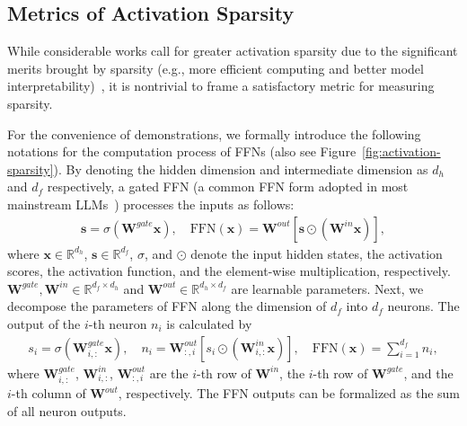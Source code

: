 \documentclass{article} %
\begin{document}

\subsection{Metrics of Activation Sparsity} \label{sec:related-metric}

While considerable works call for greater activation sparsity due to the significant merits brought by sparsity (e.g., more efficient computing and better model interpretability)~\citep{mirzadeh2023relu,song2024prosparse,song2024turbo}, it is nontrivial to frame a satisfactory metric for measuring sparsity.

For the convenience of demonstrations, we formally introduce the following notations for the computation process of FFNs (also see Figure~\ref{fig:activation-sparsity}). By denoting the hidden dimension and intermediate dimension as $d_h$ and $d_f$ respectively, a gated FFN (a common FFN form adopted in most mainstream LLMs~\citep{dauphin2017language,shazeer2020glu}) processes the inputs as follows:
\begin{equation}
    \begin{aligned}
    \label{eq:process-ffn}
    \mathbf{s} = \sigma(\mathbf{W}^{gate} \mathbf{x}), \quad
    \text{FFN}(\mathbf{x}) = \mathbf{W}^{out} [\mathbf{s} \odot (\mathbf{W}^{in} \mathbf{x})],
    \end{aligned}
\end{equation}
where $\mathbf{x}\in\mathbb{R}^{d_h}$, $\mathbf{s}\in\mathbb{R}^{d_f}$, $\sigma$, and $\odot$ denote the input hidden states, the activation scores, the activation function, and the element-wise multiplication, respectively. $\mathbf{W}^{gate},\mathbf{W}^{in}\in\mathbb{R}^{d_f \times d_h}$ and $\mathbf{W}^{out}\in\mathbb{R}^{d_h \times d_f}$ are learnable parameters. Next, we decompose the parameters of FFN along the dimension of $d_f$ into $d_f$ neurons. The output of the $i$-th neuron $n_i$ is calculated by
\begin{equation}
    \begin{aligned}
    \label{eq:process-neuron}
    s_i = \sigma(\mathbf{W}^{gate}_{i,:} \mathbf{x}), \quad
    n_i = \mathbf{W}^{out}_{:,i}[s_i \odot (\mathbf{W}^{in}_{i,:} \mathbf{x})] , \quad \text{FFN}(\mathbf{x}) = \sum_{i=1}^{d_f} n_i,
    \end{aligned}
\end{equation}
where $\mathbf{W}^{gate}_{i,:}$, $\mathbf{W}^{in}_{i,:}$, $\mathbf{W}^{out}_{:,i}$ are the $i$-th row of $\mathbf{W}^{in}$, the $i$-th row of $\mathbf{W}^{gate}$, and the $i$-th column of $\mathbf{W}^{out}$, respectively. The FFN outputs can be formalized as the sum of all neuron outputs.
\end{document}
